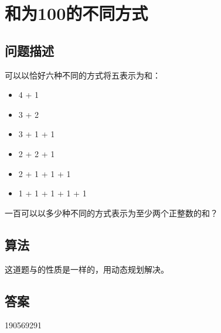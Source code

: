\section{和为100的不同方式}\label{sec:problem76}
\subsection{问题描述}
\begin{tcolorbox}
	可以以恰好六种不同的方式将五表示为和：

	\begin{itemize}
		\item 4 + 1
		\item 3 + 2
		\item 3 + 1 + 1
		\item 2 + 2 + 1
		\item 2 + 1 + 1 + 1
		\item 1 + 1 + 1 + 1 + 1
	\end{itemize}

	一百可以以多少种不同的方式表示为至少两个正整数的和？
\end{tcolorbox}

\subsection{算法}
这道题与的性质是一样的，用动态规划解决。
\subsection{答案}
190569291
